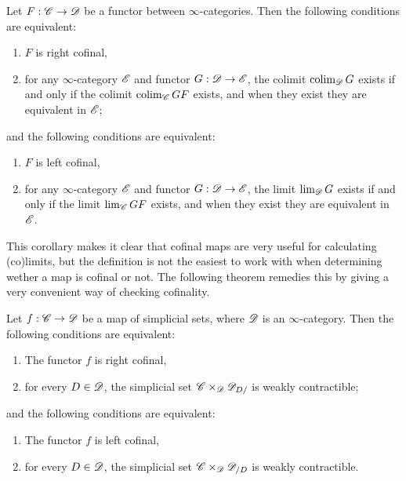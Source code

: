 \documentclass[../../thesis.tex]{subfiles}
\begin{document}
\begin{corollary}
    Let $F : \mathscr{C} \to \mathscr{D}$ be a functor between $\infty$-categories.
    Then the following conditions are equivalent:
    \begin{enumerate}
        \item $F$ is right cofinal,
        \item for any $\infty$-category $\mathscr{E}$ and functor $G:\mathscr{D}\to\mathscr{E}$, the colimit $\operatorname{colim}_{\mathscr{D}}G$ exists if and only if the colimit $\operatorname{colim}_{\mathscr{C}}GF$ exists, and when they exist they are equivalent in $\mathscr{E}$;
    \end{enumerate}
    and the following conditions are equivalent:
    \begin{enumerate}
        \item $F$ is left cofinal,
        \item for any $\infty$-category $\mathscr{E}$ and functor $G:\mathscr{D}\to\mathscr{E}$, the limit $\lim_{\mathscr{D}}G$ exists if and only if the limit $\lim_{\mathscr{C}}GF$ exists, and when they exist they are equivalent in $\mathscr{E}$.
    \end{enumerate}
\end{corollary}

This corollary makes it clear that cofinal maps are very useful for calculating (co)limits, but the definition is not the easiest to work with when determining wether a map is cofinal or not.
The following theorem remedies this by giving a very convenient way of checking cofinality.
\begin{theorem}{\cite[\href{https://kerodon.net/tag/02NY}{Theorem 02NY}]{kerodon}\label{superlemma}}
    Let \(f: \mathscr{C} \to \mathscr{D}\) be a map of simplicial sets, where $\mathscr{D}$ is an $\infty$-category.
    Then the following conditions are equivalent:
    \begin{enumerate}
        \item The functor $f$ is right cofinal,
        \item for every $D\in \mathscr{D}$, the simplicial set $\mathscr{C}\times_{\mathscr{D}} \mathscr{D}_{D/}$ is weakly contractible;
    \end{enumerate}
    and the following conditions are equivalent:
    \begin{enumerate}
        \item The functor $f$ is left cofinal,
        \item for every $D\in \mathscr{D}$, the simplicial set $\mathscr{C}\times_{\mathscr{D}} \mathscr{D}_{/D}$ is weakly contractible.
    \end{enumerate}
\end{theorem}
\end{document}
